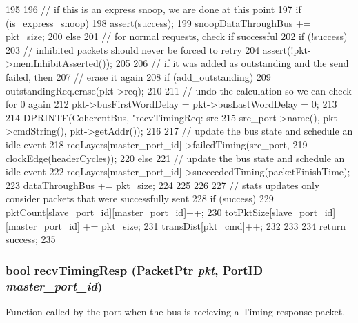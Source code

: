 \begin{DoxyCode}
{195 
196     // if this is an express snoop, we are done at this point
197     if (is_express_snoop) {
198         assert(success);
199         snoopDataThroughBus += pkt_size;
200     } else {
201         // for normal requests, check if successful
202         if (!success)  {
203             // inhibited packets should never be forced to retry
204             assert(!pkt->memInhibitAsserted());
205 
206             // if it was added as outstanding and the send failed, then
207             // erase it again
208             if (add_outstanding)
209                 outstandingReq.erase(pkt->req);
210 
211             // undo the calculation so we can check for 0 again
212             pkt->busFirstWordDelay = pkt->busLastWordDelay = 0;
213 
214             DPRINTF(CoherentBus, "recvTimingReq: src %
215                     src_port->name(), pkt->cmdString(), pkt->getAddr());
216 
217             // update the bus state and schedule an idle event
218             reqLayers[master_port_id]->failedTiming(src_port,
219                                                     clockEdge(headerCycles));
220         } else {
221             // update the bus state and schedule an idle event
222             reqLayers[master_port_id]->succeededTiming(packetFinishTime);
223             dataThroughBus += pkt_size;
224         }
225     }
226 
227     // stats updates only consider packets that were successfully sent
228     if (success) {
229         pktCount[slave_port_id][master_port_id]++;
230         totPktSize[slave_port_id][master_port_id] += pkt_size;
231         transDist[pkt_cmd]++;
232     }
233 
234     return success;
235 }
\end{DoxyCode}
\hypertarget{classCoherentBus_a47ba09f9a3b3998cac9c14ab596a7515}{
\subsubsection[{recvTimingResp}]{\setlength{\rightskip}{0pt plus 5cm}bool recvTimingResp ({\bf PacketPtr} {\em pkt}, \/  {\bf PortID} {\em master\_\-port\_\-id})}}
\label{classCoherentBus_a47ba09f9a3b3998cac9c14ab596a7515}
Function called by the port when the bus is recieving a Timing response packet. 


